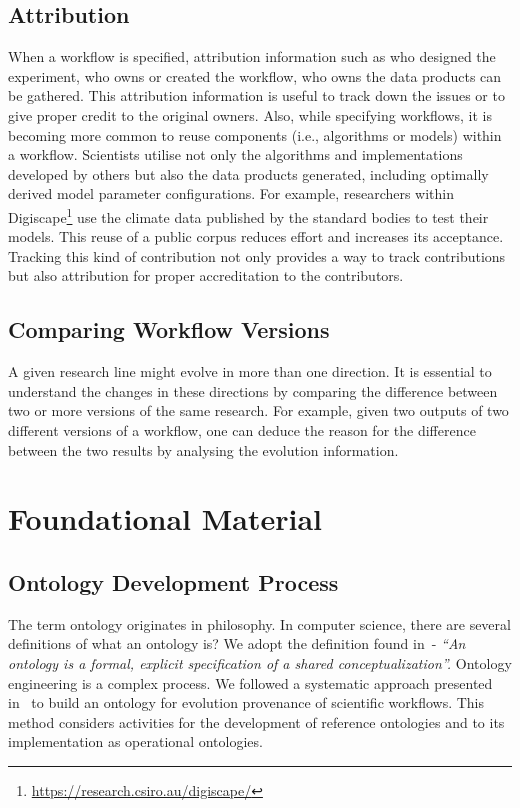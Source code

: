 \documentclass[ao]{iosart2x}
\begin{document}
\subsection{Attribution} When a workflow is specified, attribution information such as who designed the experiment, who owns or created the workflow, who owns the data products can be gathered. This attribution information is useful to track down the issues or to give proper credit to the original owners. Also, while specifying workflows, it is becoming more common to reuse components (i.e., algorithms or models) within a workflow. Scientists utilise not only the algorithms and implementations developed by others but also the data products generated, including optimally derived model parameter configurations. For example, researchers within Digiscape\footnote{\url{https://research.csiro.au/digiscape/}} use the climate data published by the standard bodies to test their models. This reuse of a public corpus reduces effort and increases its acceptance. Tracking this kind of contribution not only provides a way to track contributions but also attribution for proper accreditation to the contributors. 

\subsection{Comparing Workflow Versions} A given research line might evolve in more than one direction. It is essential to understand the changes in these directions by comparing the difference between two or more versions of the same research. For example, given two outputs of two different versions of a workflow, one can deduce the reason for the difference between the two results by analysing the evolution information.

\section{Foundational Material}
\label{sec:fundational_material}
\subsection{Ontology Development Process}

The term ontology originates in philosophy. In computer science, there are several definitions of what an ontology is? We adopt the definition found in~\citep{studer1998knowledge}- \textit{``An ontology is a formal, explicit specification of a shared conceptualization''.} 
Ontology engineering is a complex process. %
We followed a systematic approach presented in~\citep{de2014sabio} to build an ontology for evolution provenance of scientific workflows. This method considers activities for the development of reference ontologies and to its implementation as operational ontologies. %
\end{document}
